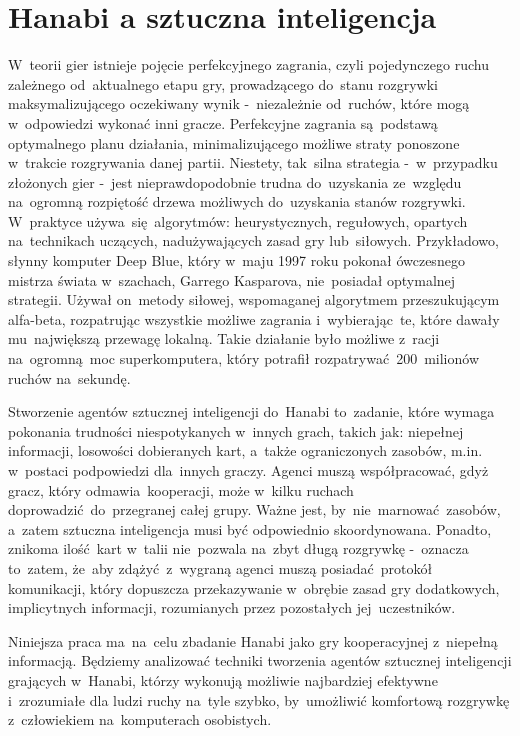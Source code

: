 \documentclass[declaration,shortabstract,inz]{iithesis}
\begin{document}
\section{Hanabi a sztuczna inteligencja}

W~teorii gier istnieje pojęcie perfekcyjnego zagrania, czyli pojedynczego ruchu zależnego od~aktualnego etapu gry, prowadzącego do~stanu rozgrywki maksymalizującego oczekiwany wynik -~niezależnie od~ruchów, które mogą w~odpowiedzi wykonać inni gracze. Perfekcyjne zagrania są~podstawą optymalnego planu działania, minimalizującego możliwe straty ponoszone w~trakcie rozgrywania danej partii. Niestety, tak~silna strategia -~w~przypadku złożonych gier -~jest nieprawdopodobnie trudna do~uzyskania ze~względu na~ogromną rozpiętość drzewa możliwych do~uzyskania stanów rozgrywki. W~praktyce używa~się algorytmów: heurystycznych, regułowych, opartych na~technikach uczących, nadużywających zasad gry lub~siłowych. Przykładowo, słynny komputer Deep Blue, który w~maju 1997 roku pokonał ówczesnego mistrza świata w~szachach, Garrego Kasparova, nie~posiadał optymalnej strategii. Używał on~metody siłowej, wspomaganej algorytmem przeszukującym alfa-beta, rozpatrując wszystkie możliwe zagrania i~wybierając~te, które dawały mu~największą przewagę lokalną. Takie działanie było możliwe z~racji na~ogromną moc superkomputera, który potrafił rozpatrywać 200~milionów ruchów na~sekundę\cite{DeepBlue}.

Stworzenie agentów sztucznej inteligencji do~Hanabi to~zadanie, które wymaga pokonania trudności niespotykanych w~innych grach, takich jak: niepełnej informacji, losowości dobieranych kart, a~także ograniczonych zasobów, m.in. w~postaci podpowiedzi dla~innych graczy. Agenci muszą współpracować, gdyż gracz, który odmawia~kooperacji, może w~kilku ruchach doprowadzić do~przegranej całej grupy. Ważne jest, by~nie~marnować zasobów, a~zatem sztuczna inteligencja musi być odpowiednio skoordynowana. Ponadto, znikoma ilość kart w~talii nie~pozwala na~zbyt długą rozgrywkę -~oznacza to~zatem, że~aby zdążyć z~wygraną agenci muszą posiadać protokół komunikacji, który dopuszcza przekazywanie w~obrębie zasad gry dodatkowych, implicytnych informacji, rozumianych przez pozostałych jej~uczestników.

Niniejsza praca ma~na~celu zbadanie Hanabi jako gry kooperacyjnej z~niepełną informacją. Będziemy analizować techniki tworzenia agentów sztucznej inteligencji grających w~Hanabi, którzy wykonują możliwie najbardziej efektywne i~zrozumiałe dla ludzi ruchy na~tyle szybko, by~umożliwić komfortową rozgrywkę z~człowiekiem na~komputerach osobistych.
\end{document}
